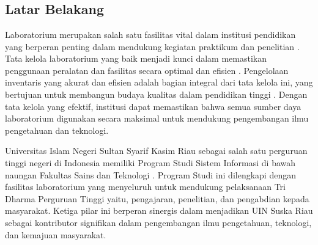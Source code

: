 %
%
%
%

\chapter{\babSatu}

\section{Latar Belakang}
Laboratorium merupakan salah satu fasilitas vital dalam institusi pendidikan yang berperan penting dalam mendukung kegiatan praktikum dan penelitian \cite{la2021comparison}. Tata kelola laboratorium yang baik menjadi kunci dalam memastikan penggunaan peralatan dan fasilitas secara optimal dan efisien \cite{abrantes2020governance}. Pengelolaan inventaris yang akurat dan efisien adalah bagian integral dari tata kelola ini, yang bertujuan untuk membangun budaya kualitas dalam pendidikan tinggi \cite{abrantes2020governance}. Dengan tata kelola yang efektif, institusi dapat memastikan bahwa semua sumber daya laboratorium digunakan secara maksimal untuk mendukung pengembangan ilmu pengetahuan dan teknologi.

Universitas Islam Negeri Sultan Syarif Kasim Riau sebagai salah satu perguruan tinggi negeri di Indonesia memiliki Program Studi Sistem Informasi di bawah naungan Fakultas Sains dan Teknologi \cite{uin-suska-website}. Program Studi ini dilengkapi dengan fasilitas laboratorium yang menyeluruh untuk mendukung pelaksanaan Tri Dharma Perguruan Tinggi yaitu, pengajaran, penelitian, dan pengabdian kepada masyarakat. Ketiga pilar ini berperan sinergis dalam menjadikan UIN Suska Riau sebagai kontributor signifikan dalam pengembangan ilmu pengetahuan, teknologi, dan kemajuan masyarakat.

